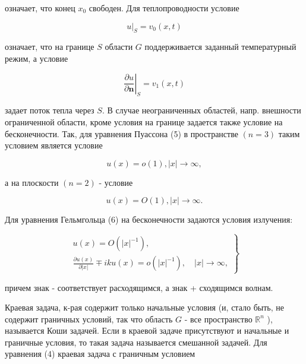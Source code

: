 \documentclass[10pt]{article}
\begin{document}
означает, что конец $x_{0}$ свободен. Для теплопроводности условие



\[

\left.u\right|_{S}=v_{0}(x, t)

\]



означает, что на границе $S$ области $G$ поддерживается заданный температурный режим, а условие



\[

\left.\frac{\partial u}{\partial \boldsymbol{n}}\right|_{S}=v_{1}(x, t)

\]



задает поток тепла через $S$. В случае неограниченных областей, напр. внешности ограниченной области, кроме условия на границе задается также условие на бесконечности. Так, для уравнения Пуассона (5) в пространстве $(n=3)$ таким условием является условие



\[

u(x)=o(1),|x| \rightarrow \infty,

\]



а на плоскости $(n=2)$ - условие



\[

u(x)=O(1),|x| \rightarrow \infty .

\]



Для уравнения Гельмгольца (6) на бесконечности задаются условия излучения:



\[

\left.\begin{array}{l}

u(x)=O\left(|x|^{-1}\right), \\

\frac{\partial u(x)}{\partial|x|} \mp i k u(x)=o\left(|x|^{-1}\right), \quad|x| \rightarrow \infty,

\end{array}\right\}

\]



причем знак - соответствует расходящимся, а знак + сходящимся волнам.



Краевая задача, к-рая содержит только начальные условия (и, стало быть, не содержит граничных условий, так что область $G$ - все пространство $\mathbb{R}^{n}$ ), называется Коши задачей. Если в краевой задаче присутствуют и начальные и граничные условия, то такая задача называется смешанной задачей. Для уравнения (4) краевая задача с граничным условием
\end{document}
